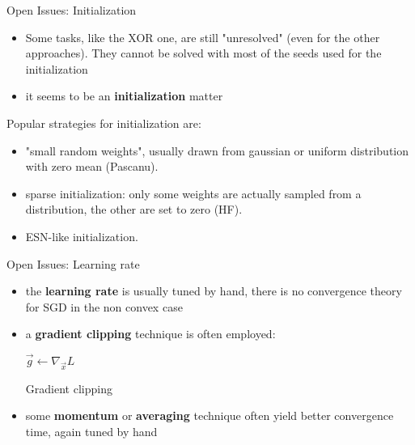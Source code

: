  
\begin{frame}{Open Issues: Initialization}
	
	\begin{itemize}
		\item Some tasks, like the XOR one, are still "unresolved" (even for the other approaches). They cannot be solved with most of the seeds used for the initialization
		\item it seems to be an \textbf{initialization} matter
	\end{itemize}
	
	Popular strategies for initialization are:
	\begin{itemize}
		\item "small random weights", usually drawn from gaussian or uniform distribution with zero mean (Pascanu). 
		\item sparse initialization: only some weights are actually sampled from a distribution, the other are set to zero (HF).
		\item ESN-like initialization\cite{reservoirSummary}.
	\end{itemize}
	
\end{frame}

\begin{frame}{Open Issues: Learning rate}
	
	\begin{itemize}	
		\item 	the \textbf{learning rate} is usually tuned by hand, there is no convergence theory for SGD in the non convex case
		\item a \textbf{gradient clipping} technique is often employed:
		\begin{algorithm}[H]
			$\vec{g} \gets \nabla_{\vec{x}} L$\\
			\caption{Gradient clipping}
			\label{algo:gradClipping}
		\end{algorithm}
		
		\item  some \textbf{momentum} or \textbf{averaging} technique often yield better convergence time, again tuned by hand
	\end{itemize}
	

\end{frame}